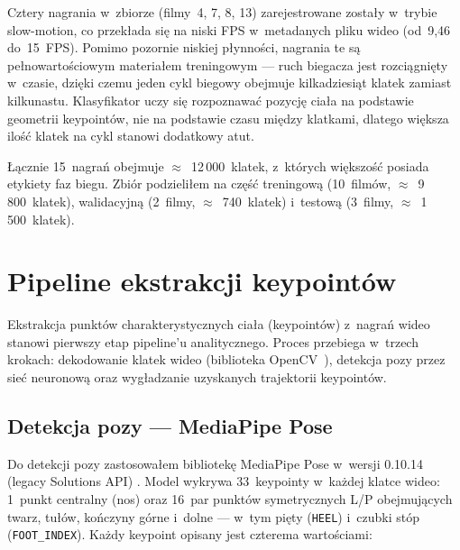Cztery nagrania w~zbiorze (filmy~4, 7, 8, 13) zarejestrowane zostały w~trybie slow-motion, co przekłada się na niski FPS w~metadanych pliku wideo (od~9{,}46 do~15~FPS). Pomimo pozornie niskiej płynności, nagrania te są pełnowartościowym materiałem treningowym --- ruch biegacza jest rozciągnięty w~czasie, dzięki czemu jeden cykl biegowy obejmuje kilkadziesiąt klatek zamiast kilkunastu. Klasyfikator uczy się rozpoznawać pozycję ciała na podstawie geometrii keypointów, nie na podstawie czasu między klatkami, dlatego większa ilość klatek na cykl stanowi dodatkowy atut.

Łącznie 15~nagrań obejmuje $\approx$~12\,000~klatek, z~których większość posiada etykiety faz biegu. Zbiór podzieliłem na część treningową (10~filmów, $\approx$~9\,800~klatek), walidacyjną (2~filmy, $\approx$~740~klatek) i~testową (3~filmy, $\approx$~1\,500~klatek).

\section{Pipeline ekstrakcji keypointów}
\label{sec:pipeline-extraction}

Ekstrakcja punktów charakterystycznych ciała (keypointów) z~nagrań wideo stanowi pierwszy etap pipeline'u analitycznego. Proces przebiega w~trzech krokach: dekodowanie klatek wideo (biblioteka OpenCV~\cite{opencv}), detekcja pozy przez sieć neuronową oraz wygładzanie uzyskanych trajektorii keypointów.

\subsection{Detekcja pozy --- MediaPipe Pose}
\label{sec:mediapipe}

Do detekcji pozy zastosowałem bibliotekę MediaPipe Pose w~wersji 0.10.14 (legacy Solutions API) \cite{bazarevsky2020blazepose}. Model wykrywa 33~keypointy w~każdej klatce wideo: 1~punkt centralny (nos) oraz 16~par punktów symetrycznych L/P obejmujących twarz, tułów, kończyny górne i~dolne --- w~tym pięty (\texttt{HEEL}) i~czubki stóp (\texttt{FOOT\_INDEX}). Każdy keypoint opisany jest czterema wartościami:

